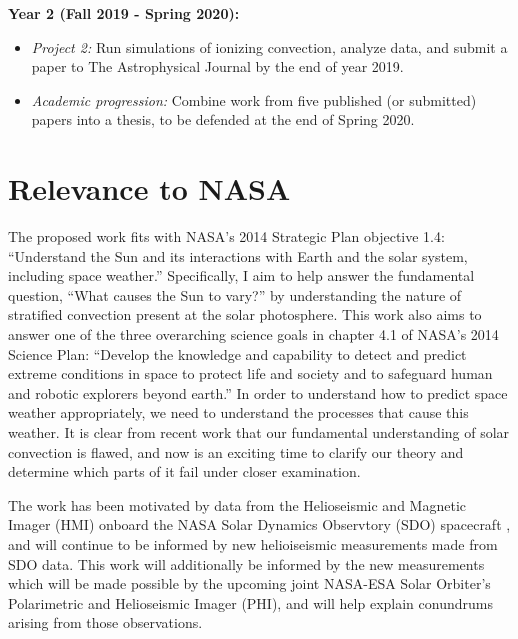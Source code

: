 \documentclass[aasms,12pt]{article}
\begin{document}
\textbf{Year 2 (Fall 2019 - Spring 2020):}
\begin{itemize}
\vspace{-0.2cm}
\item  \emph{Project 2:} Run simulations of ionizing convection, analyze data, and submit a paper to The
Astrophysical Journal by the end of year 2019.
\vspace{-0.2cm}
\item \emph{Academic progression:} Combine work from five published (or submitted) papers into a thesis, to be defended at the end of 
Spring 2020.
\end{itemize}

\section{Relevance to NASA} 
The proposed work fits with NASA's 2014 Strategic Plan objective
1.4:
``Understand the Sun and its interactions with Earth and the solar
system, including space weather.''  Specifically, I aim to help answer
the fundamental question, ``What causes the Sun to vary?'' by understanding
the nature of stratified convection present at the solar photosphere.
This work also aims to answer one of the three overarching science goals
in chapter 4.1 of NASA's 2014 Science Plan: 
``Develop the
knowledge and capability to detect and predict extreme conditions in space to
protect life and society and to safeguard human and robotic explorers beyond
earth.'' In order to understand how to predict space weather appropriately, we
need to understand the processes that cause this weather.  It is clear from
recent work that our fundamental understanding of solar convection is flawed, and
now is an exciting time to clarify our theory and determine which
parts of it fail under closer examination.  

The work has been motivated by data from the Helioseismic and Magnetic Imager (HMI) onboard
the NASA Solar Dynamics Observtory (SDO) spacecraft 
\citep{hanasoge&all2012, greer&all2015, hathaway&all2015}, and will continue to be informed by
new helioiseismic measurements made from SDO data. This work will additionally be informed
by the new measurements which will
be made possible by the upcoming joint NASA-ESA Solar Orbiter's Polarimetric and 
Helioseismic Imager (PHI), and will help explain conundrums arising from those observations.
\end{document}
